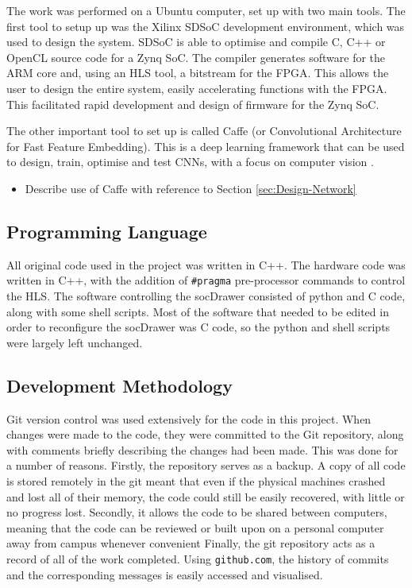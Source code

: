 \documentclass[12pt]{article}
\begin{document}
The work was performed on a Ubuntu computer, set up with two main tools. The first tool to setup up was the Xilinx SDSoC development environment, which was used to design the system. SDSoC is able to optimise and compile C, C++ or OpenCL source code for a Zynq SoC. The compiler generates software for the ARM core and, using an HLS tool, a bitstream for the FPGA. This allows the user to design the entire system, easily accelerating functions with the FPGA. This facilitated rapid development and design of firmware for the Zynq SoC.

The other important tool to set up is called Caffe (or Convolutional Architecture for Fast Feature Embedding). This is a deep learning framework that can be used to design, train, optimise and test CNNs, with a focus on computer vision \cite{jia2014caffe}.
\begin{itemize}
\item Describe use of Caffe with reference to Section \ref{sec:Design-Network}
\end{itemize}

\subsection{Programming Language}
\label{sec:Imp-Language}

All original code used in the project was written in C++. The hardware code was written in C++, with the addition of \lstinline|#pragma| pre-processor commands to control the HLS. The software controlling the socDrawer consisted of python and C code, along with some shell scripts. Most of the software that needed to be edited in order to reconfigure the socDrawer was C code, so the python and shell scripts were largely left unchanged.

\subsection{Development Methodology}
\label{sec:Imp-Devlopment}

Git version control was used extensively for the code in this project. When changes were made to the code, they were committed to the Git repository, along with comments briefly describing the changes had been made. This was done for a number of reasons. Firstly, the repository serves as a backup. A copy of all code is stored remotely in the git meant that even if the physical machines crashed and lost all of their memory, the code could still be easily recovered, with little or no progress lost. Secondly, it allows the code to be shared between computers, meaning that the code can be reviewed or built upon on a personal computer away from campus whenever convenient Finally, the git repository acts as a record of all of the work completed. Using \lstinline|github.com|, the history of commits and the corresponding messages is easily accessed and visualised. 
\end{document}
